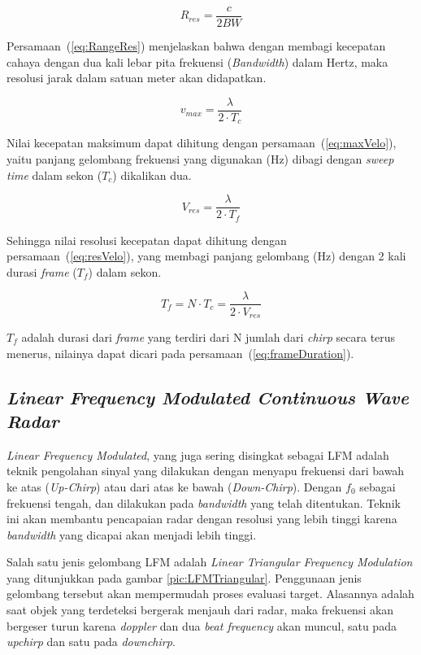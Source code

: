 \begin{equation}
	R_{res} = \frac{c}{2 BW}
	\label{eq:RangeRes}
\end{equation}

Persamaan~(\ref{eq:RangeRes}) menjelaskan bahwa dengan membagi kecepatan cahaya dengan dua kali lebar pita frekuensi (\textit{Bandwidth}) dalam Hertz, maka resolusi jarak dalam satuan meter akan didapatkan. 

\begin{equation}
	v_{max} = \frac{\lambda}{2 \cdot T_{c}}
	\label{eq:maxVelo}
\end{equation}

Nilai kecepatan maksimum dapat dihitung dengan persamaan~(\ref{eq:maxVelo}), yaitu panjang gelombang frekuensi yang digunakan (Hz) dibagi dengan \textit{sweep time} dalam sekon ($T_{c}$) dikalikan dua.

\begin{equation}
	V_{res} = \frac{\lambda}{2 \cdot T_{f}}
	\label{eq:resVelo}
\end{equation}

Sehingga nilai resolusi kecepatan dapat dihitung dengan persamaan~(\ref{eq:resVelo}), yang membagi panjang gelombang (Hz) dengan 2 kali durasi \textit{frame} ($T_{f}$) dalam sekon.

\begin{equation}
	T_{f} = N \cdot T_{c} = \frac{\lambda}{2 \cdot V_{res}}
	\label{eq:frameDuration}
\end{equation}

$T_{f}$ adalah durasi dari \textit{frame} yang terdiri dari N jumlah dari \textit{chirp} secara terus menerus, nilainya dapat dicari pada persamaan~(\ref{eq:frameDuration}).

\subsection{\textit{Linear Frequency Modulated Continuous Wave Radar}}
\textit{Linear Frequency Modulated}, yang juga sering disingkat sebagai LFM adalah teknik pengolahan sinyal yang dilakukan dengan menyapu frekuensi dari bawah ke atas (\textit{Up-Chirp}) atau dari atas ke bawah (\textit{Down-Chirp}). Dengan $f_{0}$ sebagai frekuensi tengah, dan dilakukan pada \textit{bandwidth} yang telah ditentukan. Teknik ini akan membantu pencapaian radar dengan resolusi yang lebih tinggi karena \textit{bandwidth} yang dicapai akan menjadi lebih tinggi.

Salah satu jenis gelombang LFM adalah \textit{Linear Triangular Frequency Modulation} yang ditunjukkan pada gambar \ref{pic:LFMTriangular}. Penggunaan jenis gelombang tersebut akan mempermudah proses evaluasi target. Alasannya adalah saat objek yang terdeteksi bergerak menjauh dari radar, maka frekuensi akan bergeser turun karena \textit{doppler} dan dua \textit{beat frequency} akan muncul, satu pada \textit{upchirp} dan satu pada \textit{downchirp}. 


